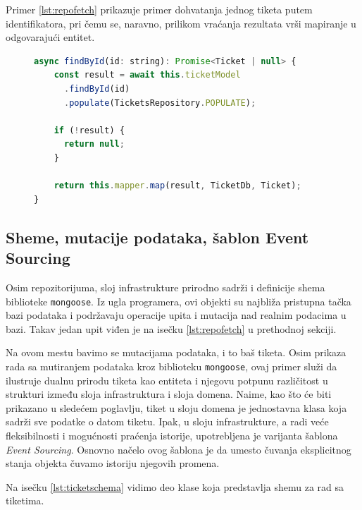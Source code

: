 \documentclass[12pt,oneside]{memoir}
\begin{document}
\newpage
Primer \ref{lst:repofetch} prikazuje primer dohvatanja jednog tiketa putem identifikatora, pri čemu se, naravno, prilikom vraćanja rezultata vrši mapiranje u odgovarajući entitet.

\begin{figure}[h]
\begin{lstlisting}[language=JavaScript, style=ES6, caption={Dohvatanje jednog entiteta.},label={lst:repofetch}]
async findById(id: string): Promise<Ticket | null> {
    const result = await this.ticketModel
      .findById(id)
      .populate(TicketsRepository.POPULATE);
    
    if (!result) {
      return null;
    }
    
    return this.mapper.map(result, TicketDb, Ticket);
}
\end{lstlisting}
\end{figure}

\newpage
\subsection{Sheme, mutacije podataka, šablon Event Sourcing}
\label{sec:eventsourcing}
Osim repozitorijuma, sloj infrastrukture prirodno sadrži i definicije shema biblioteke \verb|mongoose|. Iz ugla programera, ovi objekti su najbliža pristupna tačka bazi podataka i podržavaju operacije upita i mutacija nad realnim podacima u bazi. Takav jedan upit viđen je na isečku \ref{lst:repofetch} u prethodnoj sekciji.

Na ovom mestu bavimo se mutacijama podataka, i to baš tiketa. Osim prikaza rada sa mutiranjem podataka kroz biblioteku \verb|mongoose|, ovaj primer služi da ilustruje dualnu prirodu tiketa kao entiteta i njegovu potpunu različitost u strukturi između sloja infrastruktura i sloja domena. Naime, kao što će biti prikazano u sledećem poglavlju, tiket u sloju domena je jednostavna klasa koja sadrži sve podatke o datom tiketu. Ipak, u sloju infrastrukture, a radi veće fleksibilnosti i mogućnosti praćenja istorije, upotrebljena je varijanta šablona \textit{Event Sourcing}. Osnovno načelo ovog šablona je da umesto čuvanja eksplicitnog stanja objekta čuvamo istoriju njegovih promena.

Na isečku \ref{lst:ticketschema} vidimo deo klase koja predstavlja shemu za rad sa tiketima.
\end{document}
